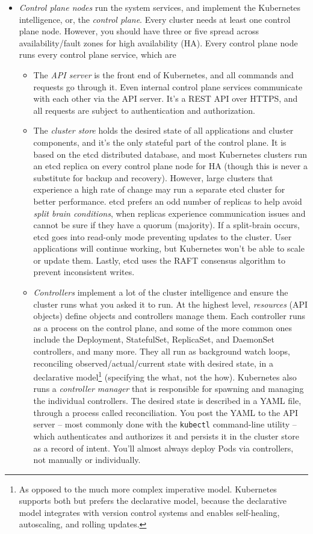 \documentclass[8pt, table, xcdraw]{article}%
\begin{document}
\begin{itemize}
\begin{itemize}
		\item \emph{Control plane nodes} run the system services, and implement the Kubernetes intelligence, or, the \emph{control plane}. Every cluster needs at least one control plane node. However, you should have three or five spread across availability/fault zones for high availability (HA). Every control plane node runs every control plane service, which are
	
		\begin{itemize}
			\item The \emph{API server} is the front end of Kubernetes, and all commands and requests go through it. Even internal control plane services communicate with each other via the API server. It's a REST API over HTTPS, and all requests are subject to authentication and authorization.
			\item The \emph{cluster store} holds the desired state of all applications and cluster components, and it’s the only stateful part of the control plane. It is based on the etcd distributed database, and most Kubernetes clusters run an etcd replica on every control plane node for HA (though this is never a substitute for backup and recovery). However, large clusters that experience a high rate of change may run a separate etcd cluster for better performance. etcd prefers an odd number of replicas to help avoid \emph{split brain conditions}, when replicas experience communication issues and cannot be sure if they have a quorum (majority). If a split-brain occurs, etcd goes into read-only mode preventing updates to the cluster. User applications will continue working, but Kubernetes won’t be able to scale or update them. Lastly, etcd uses the RAFT consensus algorithm to prevent inconsistent writes.
			\item \emph{Controllers} implement a lot of the cluster intelligence and ensure the cluster runs what you asked it to run. At the highest level, \emph{resources} (API objects) define objects and controllers manage them. Each controller runs as a process on the control plane, and some of the more common ones include the Deployment, StatefulSet, ReplicaSet, and DaemonSet controllers, and many more. They all run as background watch loops, reconciling observed/actual/current state with desired state, in a declarative model\footnote{As opposed to the much more complex imperative model. Kubernetes supports both but prefers the declarative model, because the declarative model integrates with version control systems and enables self-healing, autoscaling, and rolling updates.} (specifying the what, not the how). Kubernetes also runs a \emph{controller manager} that is responsible for spawning and managing the individual controllers. The desired state is described in a YAML file, through a process called reconciliation. You post the YAML to the API server -- most commonly done with the \lstinline{kubectl} command-line utility -- which authenticates and authorizes it and persists it in the cluster store as a record of intent. You’ll almost always deploy Pods via controllers, not manually or individually.

\end{itemize}
\end{itemize}
\end{itemize}
\end{document}
